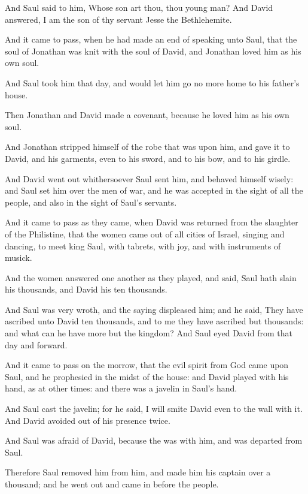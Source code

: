 \Verse And Saul said to him, Whose son art thou, thou young man? And David answered, I am the son of thy servant Jesse the Bethlehemite.


\Chapter
\Verse And it came to pass, when he had made an end of speaking unto Saul, that the soul of Jonathan was knit with the soul of David, and Jonathan loved him as his own soul.

\Verse And Saul took him that day, and would let him go no more home to his father's house.

\Verse Then Jonathan and David made a covenant, because he loved him as his own soul.

\Verse And Jonathan stripped himself of the robe that was upon him, and gave it to David, and his garments, even to his sword, and to his bow, and to his girdle.

\Verse And David went out whithersoever Saul sent him, and behaved himself wisely: and Saul set him over the men of war, and he was accepted in the sight of all the people, and also in the sight of Saul's servants.

\Verse And it came to pass as they came, when David was returned from the slaughter of the Philistine, that the women came out of all cities of Israel, singing and dancing, to meet king Saul, with tabrets, with joy, and with instruments of musick.

\Verse And the women answered one another as they played, and said, Saul hath slain his thousands, and David his ten thousands.

\Verse And Saul was very wroth, and the saying displeased him; and he said, They have ascribed unto David ten thousands, and to me they have ascribed but thousands: and what can he have more but the kingdom?  \Verse And Saul eyed David from that day and forward.

\Verse And it came to pass on the morrow, that the evil spirit from God came upon Saul, and he prophesied in the midst of the house: and David played with his hand, as at other times: and there was a javelin in Saul's hand.

\Verse And Saul cast the javelin; for he said, I will smite David even to the wall with it. And David avoided out of his presence twice.

\Verse And Saul was afraid of David, because the \LORD was with him, and was departed from Saul.

\Verse Therefore Saul removed him from him, and made him his captain over a thousand; and he went out and came in before the people.

